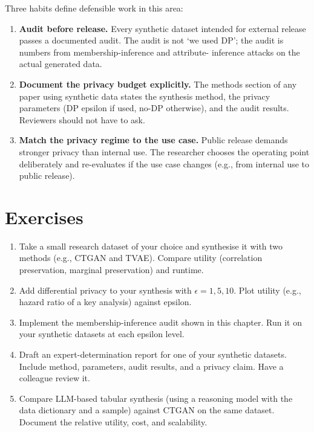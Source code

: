 \documentclass[
  letterpaper,
  11pt]{scrbook}
\begin{document}
Three habits define defensible work in this area:

\begin{enumerate}
\def\labelenumi{\arabic{enumi}.}
\item
  \textbf{Audit before release.} Every synthetic dataset intended for
  external release passes a documented audit. The audit is not `we used
  DP'; the audit is numbers from membership-inference and attribute-
  inference attacks on the actual generated data.
\item
  \textbf{Document the privacy budget explicitly.} The methods section
  of any paper using synthetic data states the synthesis method, the
  privacy parameters (DP epsilon if used, no-DP otherwise), and the
  audit results. Reviewers should not have to ask.
\item
  \textbf{Match the privacy regime to the use case.} Public release
  demands stronger privacy than internal use. The researcher chooses the
  operating point deliberately and re-evaluates if the use case changes
  (e.g., from internal use to public release).
\end{enumerate}

\section{Exercises}\label{exercises-5}

\begin{enumerate}
\def\labelenumi{\arabic{enumi}.}
\item
  Take a small research dataset of your choice and synthesise it with
  two methods (e.g., CTGAN and TVAE). Compare utility (correlation
  preservation, marginal preservation) and runtime.
\item
  Add differential privacy to your synthesis with
  \(\epsilon = 1, 5, 10\). Plot utility (e.g., hazard ratio of a key
  analysis) against epsilon.
\item
  Implement the membership-inference audit shown in this chapter. Run it
  on your synthetic datasets at each epsilon level.
\item
  Draft an expert-determination report for one of your synthetic
  datasets. Include method, parameters, audit results, and a privacy
  claim. Have a colleague review it.
\item
  Compare LLM-based tabular synthesis (using a reasoning model with the
  data dictionary and a sample) against CTGAN on the same dataset.
  Document the relative utility, cost, and scalability.
\end{enumerate}
\end{document}
